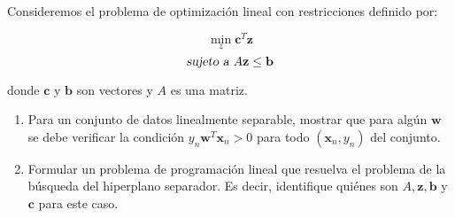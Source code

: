 \documentclass[11pt,leqno]{article}
\theoremstyle{definition}
\begin{document}
\begin{cuestion}
Consideremos el problema de optimización lineal con restricciones definido por:

\[ \min_z \mathbf{c}^T\mathbf{z} \]
\[ \textsl{sujeto a } A\mathbf{z} \leq \mathbf{b} \]

donde $\mathbf{c}$ y $\mathbf{b}$ son vectores y $A$ es una matriz.

\begin{enumerate}
\item Para un conjunto de datos linealmente separable, mostrar que para algún $\mathbf{w}$ se debe verificar la condición $y_n \mathbf{w}^T \mathbf{x}_n > 0$ para todo $(\mathbf{x}_n,y_n)$ del conjunto.
\item Formular un problema de programación lineal que resuelva el problema de la búsqueda del hiperplano separador. Es decir, identifique quiénes son $A, \mathbf{z}, \mathbf{b}$ y $\mathbf{c}$ para este caso.
\end{enumerate}
\end{cuestion}
\end{document}

